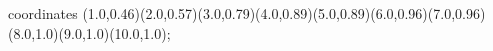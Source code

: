 					coordinates { (1.0,0.46)(2.0,0.57)(3.0,0.79)(4.0,0.89)(5.0,0.89)(6.0,0.96)(7.0,0.96)(8.0,1.0)(9.0,1.0)(10.0,1.0)};